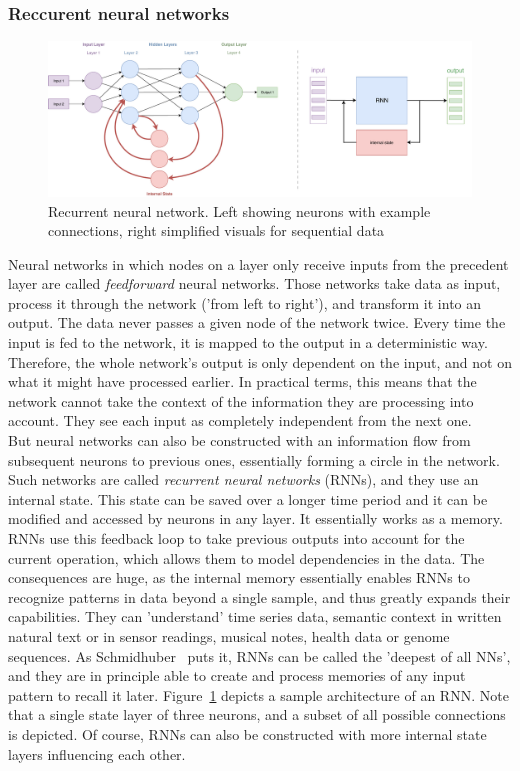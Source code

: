 \documentclass[
a4paper,
pagesize,
pdftex,
12pt,
twoside, %
BCOR=5mm, %
ngerman,
fleqn,
final,
]{scrartcl}
\begin{document}
	\subsubsection{Reccurent neural networks}\label{RNN}
	\begin{figure}[ht]
		\centering
		\includegraphics[width=\linewidth]{img/RecurrentNeuralNetwork}
		\caption{Recurrent neural network. Left showing neurons with example connections, right simplified visuals for sequential data}
		\label{fig:rnn}
	\end{figure}
	Neural networks in which nodes on a layer only receive inputs from the precedent layer are called \textit{feedforward} neural networks. Those networks take data as input, process it through the network ('from left to right'), and transform it into an output. The data never passes a given node of the network twice. Every time the input is fed to the network, it is mapped to the output in a deterministic way. Therefore, the whole network's output is only dependent on the input, and not on what it might have processed earlier. In practical terms, this means that the network cannot take the context of the information they are processing into account. They see each input as completely independent from the next one.\\
	But neural networks can also be constructed with an information flow from subsequent neurons to previous ones, essentially forming a circle in the network. Such networks are called \textit{recurrent neural networks} (RNNs), and they use an internal state. This state can be saved over a longer time period and it can be modified and accessed by neurons in any layer. It essentially works as a memory. RNNs use this feedback loop to take previous outputs into account for the current operation, which allows them to model dependencies in the data. The consequences are huge, as the internal memory essentially enables RNNs to recognize patterns in data beyond a single sample, and thus greatly expands their capabilities. They can 'understand' time series data, semantic context in written natural text or in sensor readings, musical notes, health data or genome sequences. As Schmidhuber~\cite{Schmidhuber.2015} puts it, RNNs can be called the 'deepest of all NNs', and they are in principle able to create and process memories of any input pattern to recall it later. Figure~\ref{fig:rnn} depicts a sample architecture of an RNN. Note that a single state layer of three neurons, and a subset of all possible connections is depicted. Of course, RNNs can also be constructed with more internal state layers influencing each other.\\
\end{document}
